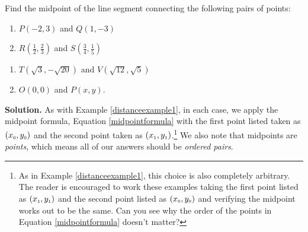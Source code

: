 \documentclass{ximera}
\begin{document}
\begin{example} 

Find the midpoint of the line segment connecting the following pairs of points:  


\begin{multicols}{2}
\begin{enumerate}

\item $P(-2,3)$ and  $Q(1,-3)$ 

\item $R\left( \frac{1}{2}, \frac{2}{3}\right)$ and $S\left( \frac{3}{4}, \frac{1}{5}\right)$ 

\setcounter{HW}{\value{enumi}}
\end{enumerate}
\end{multicols}

\begin{multicols}{2}
\begin{enumerate}
\setcounter{enumi}{\value{HW}}

\item  $T(\sqrt{3}, -\sqrt{20})$ and $V(\sqrt{12}, \sqrt{5})$

\item   $O(0,0)$ and $P(x,y)$. 

\end{enumerate}
\end{multicols}

\medskip

{\bf Solution.}  As with Example \ref{distanceexample1}, in each case, we apply the midpoint formula, Equation \ref{midpointformula} with the first point listed taken as  $\left(x_{\mbox{\tiny$0$}}, y_{\mbox{\tiny$0$}}\right)$ and the second point taken as $\left(x_{\mbox{\tiny$1$}}, y_{\mbox{\tiny$1$}}\right)$.\footnote{As in Example \ref{distanceexample1}, this choice is also completely arbitrary.  The reader is encouraged to work these examples taking the first point listed as $\left(x_{\mbox{\tiny$1$}}, y_{\mbox{\tiny$1$}}\right)$ and the second point listed as $\left(x_{\mbox{\tiny$0$}}, y_{\mbox{\tiny$0$}}\right)$ and verifying the midpoint works out to be the same.  Can you see why the order of the points in Equation \ref{midpointformula} doesn't matter?}  We also note that midpoints are \textit{points}, which means all of our answers should be \textit{ordered pairs}.

\begin{enumerate}


\end{enumerate}
\end{example}
\end{document}
